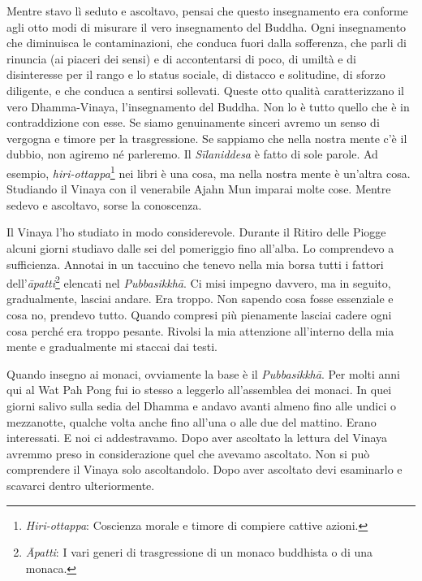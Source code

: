 Mentre stavo lì seduto e ascoltavo, pensai che questo insegnamento era
conforme agli otto modi di misurare il vero insegnamento del Buddha.
Ogni insegnamento che diminuisca le contaminazioni, che conduca fuori
dalla sofferenza, che parli di rinuncia (ai piaceri dei sensi) e di
accontentarsi di poco, di umiltà e di disinteresse per il rango e lo
status sociale, di distacco e solitudine, di sforzo diligente, e che
conduca a sentirsi sollevati. Queste otto qualità caratterizzano il vero
Dhamma-Vinaya, l'insegnamento del Buddha. Non lo è tutto quello che è in
contraddizione con esse. Se siamo genuinamente sinceri avremo un senso
di vergogna e timore per la trasgressione. Se sappiamo che nella nostra
mente c'è il dubbio, non agiremo né parleremo. Il \emph{Sīlaniddesa} è
fatto di sole parole. Ad esempio, \emph{hiri-ottappa}\footnote{\emph{Hiri-ottappa}:
  Coscienza morale e timore di compiere cattive azioni.} nei libri è una
cosa, ma nella nostra mente è un'altra cosa. Studiando il Vinaya con il
venerabile Ajahn Mun imparai molte cose. Mentre sedevo e ascoltavo,
sorse la conoscenza.

Il Vinaya l'ho studiato in modo considerevole. Durante il Ritiro delle
Piogge alcuni giorni studiavo dalle sei del pomeriggio fino all'alba. Lo
comprendevo a sufficienza. Annotai in un taccuino che tenevo nella mia
borsa tutti i fattori dell'\emph{āpatti}\footnote{\emph{Āpatti}: I vari
  generi di trasgressione di un monaco buddhista o di una monaca.}
elencati nel \emph{Pubbasikkhā}. Ci misi impegno davvero, ma in seguito,
gradualmente, lasciai andare. Era troppo. Non sapendo cosa fosse
essenziale e cosa no, prendevo tutto. Quando compresi più pienamente
lasciai cadere ogni cosa perché era troppo pesante. Rivolsi la mia
attenzione all'interno della mia mente e gradualmente mi staccai dai
testi.

Quando insegno ai monaci, ovviamente la base è il \emph{Pubbasikkhā}.
Per molti anni qui al Wat Pah Pong fui io stesso a leggerlo
all'assemblea dei monaci. In quei giorni salivo sulla sedia del Dhamma
e andavo avanti almeno fino alle undici o mezzanotte, qualche volta
anche fino all'una o alle due del mattino. Erano interessati. E noi ci
addestravamo. Dopo aver ascoltato la lettura del Vinaya avremmo preso in
considerazione quel che avevamo ascoltato. Non si può comprendere il
Vinaya solo ascoltandolo. Dopo aver ascoltato devi esaminarlo e scavarci
dentro ulteriormente.

